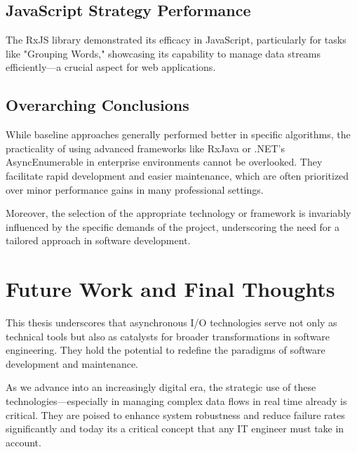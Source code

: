 \subsection{JavaScript Strategy Performance}
The RxJS library demonstrated its efficacy in JavaScript, particularly for tasks like "Grouping Words," showcasing its capability to manage data streams efficiently—a crucial aspect for web applications.

\subsection{Overarching Conclusions}
While baseline approaches generally performed better in specific algorithms, the practicality of using advanced frameworks like RxJava or .NET's AsyncEnumerable in enterprise environments cannot be overlooked. They facilitate rapid development and easier maintenance, which are often prioritized over minor performance gains in many professional settings.

Moreover, the selection of the appropriate technology or framework is invariably influenced by the specific demands of the project, underscoring the need for a tailored approach in software development.

\section{Future Work and Final Thoughts}

This thesis underscores that asynchronous I/O technologies serve not only as technical tools but also as catalysts for broader transformations in software engineering. They hold the potential to redefine the paradigms of software development and maintenance.

As we advance into an increasingly digital era, the strategic use of these technologies—especially in managing complex data flows in real time already is critical. They are poised to enhance system robustness and reduce failure rates significantly and today its a critical concept that any IT engineer must take in account.



